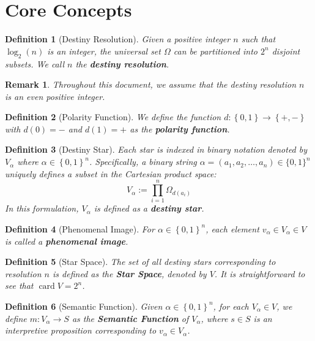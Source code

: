\documentclass[a4paper,14pt, twoside]{memoir}
\newtheorem{definition}{Definition}[chapter]
\newtheorem{remark}{Remark}
\DeclareMathOperator{\card}{card}
\newcommand{\set}[1]{\left\{#1\right\}} %
\begin{document}
\section{Core Concepts}
\begin{definition}[Destiny Resolution]
	Given a positive integer $n$ such that $\log_2(n)$ is an integer, the universal set $\Omega$ can be partitioned into $2^n$ disjoint subsets. We call $n$ the \textbf{destiny resolution}.
\end{definition}
\begin{remark}
	Throughout this document, we assume that the destiny resolution $n$ is an even positive integer.
\end{remark}
\begin{definition}[Polarity Function]
	We define the function $d : \set{0,1} \rightarrow \set{+,-}$ with $d(0) = -$ and $d(1) = +$ as the \textbf{polarity function}.
\end{definition}
\begin{definition}[Destiny Star]
	Each star is indexed in binary notation denoted by $V_\alpha$ where $\alpha \in \set{0,1}^n$. Specifically, a binary string $\alpha = (a_1, a_2, \dots, a_n) \in \{0, 1\}^n$ uniquely defines a subset in the Cartesian product space:
	$$V_\alpha := \prod_{i=1}^{n} \Omega_{d(a_i)}$$
	In this formulation, $V_\alpha$ is defined as a \textbf{destiny star}.
\end{definition}
\begin{definition}[Phenomenal Image]
	For $\alpha \in \set{0,1}^n$, each element $v_\alpha \in V_\alpha \in V$ is called a \textbf{phenomenal image}.
\end{definition}
\begin{definition}[Star Space]
	The set of all destiny stars corresponding to resolution $n$ is defined as the \textbf{Star Space}, denoted by $V$. It is straightforward to see that $\card V = 2^n$.
\end{definition}
\begin{definition}[Semantic Function]
	Given $\alpha \in \set{0,1}^n$, for each $V_\alpha \in V$, we define $m : V_\alpha \to S$ as the \textbf{Semantic Function} of $V_\alpha$, where $s \in S$ is an interpretive proposition corresponding to $v_\alpha \in V_\alpha$.
\end{definition}
\end{document}
